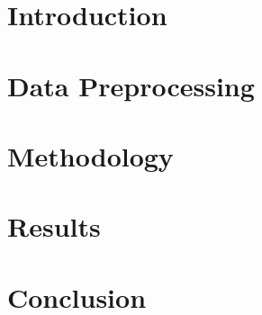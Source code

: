 \documentclass[NOTE, disdraft=true, UKenglish]{\DISCDTLATEXPATH UCLCDTDISdoc}
\begin{document}
\maketitle

\tableofcontents

\clearpage

\newpage
\section{Introduction}
\label{sec:introduction}


\section{Data Preprocessing}
\label{sec:data}


\section{Methodology}
\label{sec:methodology}


\section{Results}
\label{sec:results}


\section{Conclusion}
\label{sec:conclusion}

\end{document}
